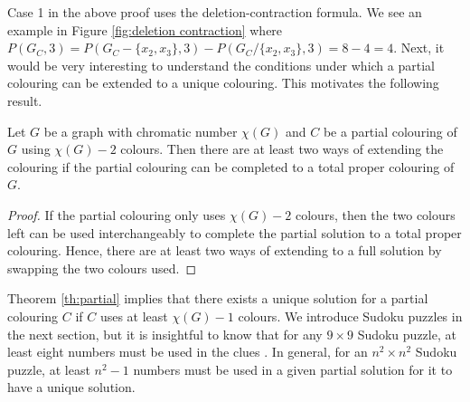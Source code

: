 \documentclass[../main.tex]{subfiles}
\begin{document}
    Case 1 in the above proof uses the deletion-contraction formula. We see an example in Figure \ref{fig:deletion contraction} where $P(G_C,3)=P(G_C-\{x_2,x_3\},3)-P(G_C/\{x_2,x_3\},3) = 8-4 = 4$. Next, it would be very interesting to understand the conditions under which a partial colouring can be extended to a unique colouring. This motivates the following result.

    \begin{theorem} \label{th:partial}
        Let $G$ be a graph with chromatic number $\chi(G)$ and $C$ be a partial colouring of $G$ using $\chi(G)-2$ colours. Then there are at least two ways of extending the colouring if the partial colouring can be completed to a total proper colouring of $G$.
    \end{theorem}
    \begin{proof}
        If the partial colouring only uses $\chi(G)-2$ colours, then the two colours left can be used interchangeably to complete the partial solution to a total proper colouring. Hence, there are at least two ways of extending to a full solution by swapping the two colours used.
    \end{proof}
    Theorem \ref{th:partial} implies that there exists a unique solution for a partial colouring $C$ if $C$ uses at least $\chi(G)-1$ colours. We introduce Sudoku puzzles in the next section, but it is insightful to know that for any $9\times 9$ Sudoku puzzle, at least eight numbers must be used in the clues \cite{herzberg2007sudoku}. In general, for an $n^2\times n^2$ Sudoku puzzle, at least $n^2-1$ numbers must be used in a given partial solution for it to have a unique solution.
\end{document}
